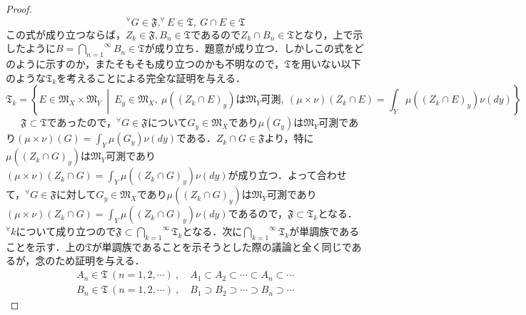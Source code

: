 \documentclass[a4paper,11pt]{jsarticle}
\newtheorem{proof}{証明}
\begin{document}
\begin{proof}
\begin{equation*}
^\forall G\in \mathfrak{F}, ^\forall E\in \mathfrak{T},{\ }G\cap E\in \mathfrak{T}
\end{equation*}
この式が成り立つならば，$Z_k\in \mathfrak{F},B_n\in \mathfrak{T}$であるので$Z_k\cap B_n\in \mathfrak{T}$となり，上で示したように$B=\overset{\infty}{\underset{n=1}{\bigcap}}B_n\in\mathfrak{T}$が成り立ち．題意が成り立つ．しかしこの式をどのように示すのか，またそもそも成り立つのかも不明なので，$\mathfrak{T}$を用いない以下のような$\mathfrak{T}_k$を考えることによる完全な証明を与える．
\begin{equation*}
\mathfrak{T}_k=\left\{E\in \mathfrak{M}_X\times\mathfrak{M}_Y{\ }\middle|{\ } E_y\in \mathfrak{M}_X,{\ }\mu((Z_k\cap E)_y) は \mathfrak{M}_Y 可測 ,{\ }(\mu\times\nu)(Z_k\cap E)=\int_Y\mu((Z_k\cap E)_y)\nu(dy)\right\}
\end{equation*}
{\ }{\ }{\ }$\mathfrak{F}\subset \mathfrak{T}$であったので，$^\forall G\in \mathfrak{F}$について$G_y\in \mathfrak{M}_X$であり$\mu(G_y)$は$\mathfrak{M}_Y$可測であり$(\mu\times\nu)(G)=\int_Y\mu(G_y)\nu(dy)$である．$Z_k\cap G\in \mathfrak{F}$より，特に$\mu((Z_k\cap G)_y)$は$\mathfrak{M}_Y$可測であり$(\mu\times\nu)(Z_k\cap G)=\int_Y\mu((Z_k\cap G)_y)\nu(dy)$が成り立つ．よって合わせて，$^\forall G\in \mathfrak{F}$に対して$G_y\in \mathfrak{M}_X$であり$\mu((Z_k\cap G)_y)$は$\mathfrak{M}_Y$可測であり$(\mu\times\nu)(Z_k\cap G)=\int_Y\mu((Z_k\cap G)_y)\nu(dy)$であるので，$\mathfrak{F}\subset \mathfrak{T}_k$となる．$^\forall k$について成り立つので$\mathfrak{F}\subset \overset{\infty}{\underset{k=1}{\bigcap}}\mathfrak{T}_k$となる．次に$\overset{\infty}{\underset{k=1}{\bigcap}}\mathfrak{T}_k$が単調族であることを示す．上の$\mathfrak{T}$が単調族であることを示そうとした際の議論と全く同じであるが，念のため証明を与える．
\begin{eqnarray*}
A_n\in \mathfrak{T}{\ }(n=1,2,\cdots){\ },\quad A_1\subset A_2\subset \cdots\subset A_n \subset\cdots \\
B_n\in \mathfrak{T}{\ }(n=1,2,\cdots){\ },\quad B_1\supset B_2\supset \cdots\supset B_n \supset\cdots
\end{eqnarray*}

\end{proof}
\end{document}
